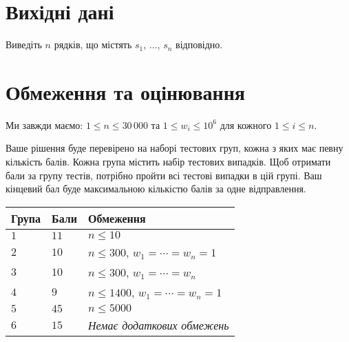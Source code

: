 \section*{Вихідні дані}

Виведіть $n$ рядків, що містять $s_1$, $\ldots$, $s_n$ відповідно.

\section*{Обмеження та оцінювання}

Ми завжди маємо:
$1\leq n \leq 30\,000$ %
та
$1\leq w_i \leq 10^6$ для кожного $1\leq i \leq n$.%

Ваше рішення буде перевірено на наборі тестових груп, кожна з яких має певну кількість балів.
Кожна група містить набір тестових випадків.
Щоб отримати бали за групу тестів, потрібно пройти всі тестові випадки в цій групі.
Ваш кінцевий бал буде максимальною кількістю балів за одне відправлення.

\medskip
\begin{tabular}{lll}
Група & Бали & Обмеження \\\hline
$1$   & $11$ & $n\leq 10$ \\
$2$   & $10$ & $n\leq 300$, $w_1=\cdots=w_n = 1$ \\
$3$   & $10$ & $n\leq 300$, $w_1=\cdots=w_n$ \\ %
$4$   & $9$ & $n\leq 1400$, $w_1=\cdots=w_n = 1$ \\
$5$   & $45$ & $n\leq 5000$\\
$6$   & $15$ & \emph{Немає додаткових обмежень}
\end{tabular}


